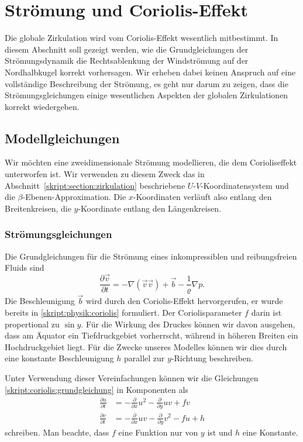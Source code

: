 %
%
%
\section{Strömung und Coriolis-Effekt}
Die globale Zirkulation wird vom Coriolis-Effekt wesentlich mitbestimmt.
In diesem Abschnitt soll gezeigt werden, wie die Grundgleichungen der
Strömungsdynamik die Rechtsablenkung der Windströmung auf der Nordhalbkugel
korrekt vorhersagen.
Wir erheben dabei keinen Anspruch auf eine vollständige Beschreibung
der Strömung, es geht nur darum zu zeigen, dass die Strömungsgleichungen
einige wesentlichen Aspekten der globalen Zirkulationen korrekt
wiedergeben.

\subsection{Modellgleichungen}
Wir möchten eine zweidimensionale Strömung modellieren, die dem
Corioliseffekt unterworfen ist.
Wir verwenden zu diesem Zweck das in Abschnitt~\ref{skript:section:zirkulation}
beschriebene $U$-$V$-Koordinatensystem und die $\beta$-Ebenen-Approximation.
Die $x$-Koordinaten verläuft also entlang den Breitenkreisen, die 
$y$-Koordinate entlang den Längenkreisen.

\subsubsection{Strömungsgleichungen}
Die Grundgleichungen für die Strömung eines inkompressiblen und reibungsfreien
Fluids sind
\begin{equation}
\frac{\partial\vec v}{\partial t}
=
-\nabla (\vec{v}\vec{v})
+\vec{b} -\frac1{\varrho}\nabla p.
\label{skript:coriolis:grundgleichung}
\end{equation}
Die Beschleunigung $\vec{b}$ wird durch den Coriolis-Effekt hervorgerufen,
er wurde bereits in \eqref{skript:physik:coriolis} formuliert.
Der Coriolisparameter $f$ darin ist propertional zu $\sin y$.
Für die Wirkung des Druckes können wir davon ausgehen, dass
am Äquator ein Tiefdruckgebiet vorherrscht, während in höheren Breiten
ein Hochdruckgebiet liegt.
Für die Zwecke unseres Modelles können wir dies durch eine konstante
Beschleunigung $h$ parallel zur $y$-Richtung beschreiben.

Unter Verwendung dieser Vereinfachungen können wir die Gleichungen
\eqref{skript:coriolis:grundgleichung}
in Komponenten als
\begin{align*}
\frac{\partial u}{\partial t}
&=
-\frac{\partial}{\partial x}u^2
-
\frac{\partial}{\partial y}uv
+
fv
\\
\frac{\partial v}{\partial t}
&=
-\frac{\partial}{\partial x}uv
-
\frac{\partial}{\partial y}v^2
-
fu
+
h
\end{align*}
schreiben.
Man beachte, dass $f$ eine Funktion nur von $y$ ist und $h$ eine Konstante.

